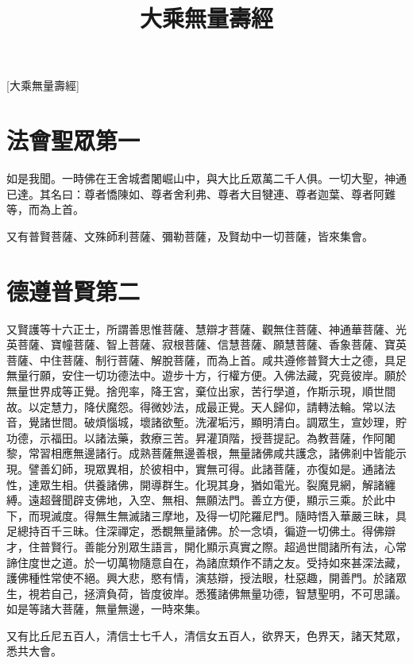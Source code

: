 \documentclass{zhvt-classic}
\title{大乘無量壽經}
\begin{document}
[大乘無量壽經]

\setcounter{page}{1}
\tableofcontents

\mainmatter

\chapter*{法會聖眾第一}

如是我聞。一時佛在王舍城耆闍崛山中，與大比丘眾萬二千人俱。一切大聖，神通已達。其名曰：尊者憍陳如、尊者舍利弗、尊者大目犍連、尊者迦葉、尊者阿難等，而為上首。

又有普賢菩薩、文殊師利菩薩、彌勒菩薩，及賢劫中一切菩薩，皆來集會。

\chapter*{德遵普賢第二}

又賢護等十六正士，所謂善思惟菩薩、慧辯才菩薩、觀無住菩薩、神通華菩薩、光英菩薩、寶幢菩薩、智上菩薩、寂根菩薩、信慧菩薩、願慧菩薩、香象菩薩、寶英菩薩、中住菩薩、制行菩薩、解脫菩薩，而為上首。咸共遵修普賢大士之德，具足無量行願，安住一切功德法中。遊步十方，行權方便。入佛法藏，究竟彼岸。願於無量世界成等正覺。捨兜率，降王宮，棄位出家，苦行學道，作斯示現，順世間故。以定慧力，降伏魔怨。得微妙法，成最正覺。天人歸仰，請轉法輪。常以法音，覺諸世間。破煩惱城，壞諸欲塹。洗濯垢污，顯明清白。調眾生，宣妙理，貯功德，示福田。以諸法藥，救療三苦。昇灌頂階，授菩提記。為教菩薩，作阿闍黎，常習相應無邊諸行。成熟菩薩無邊善根，無量諸佛咸共護念，諸佛剎中皆能示現。譬善幻師，現眾異相，於彼相中，實無可得。此諸菩薩，亦復如是。通諸法性，達眾生相。供養諸佛，開導群生。化現其身，猶如電光。裂魔見網，解諸纏縛。遠超聲聞辟支佛地，入空、無相、無願法門。善立方便，顯示三乘。於此中下，而現滅度。得無生無滅諸三摩地，及得一切陀羅尼門。隨時悟入華嚴三昧，具足總持百千三昧。住深禪定，悉覩無量諸佛。於一念頃，徧遊一切佛土。得佛辯才，住普賢行。善能分別眾生語言，開化顯示真實之際。超過世間諸所有法，心常諦住度世之道。於一切萬物隨意自在，為諸庶類作不請之友。受持如來甚深法藏，護佛種性常使不絕。興大悲，愍有情，演慈辯，授法眼，杜惡趣，開善門。於諸眾生，視若自己，拯濟負荷，皆度彼岸。悉獲諸佛無量功德，智慧聖明，不可思議。如是等諸大菩薩，無量無邊，一時來集。

又有比丘尼五百人，清信士七千人，清信女五百人，欲界天，色界天，諸天梵眾，悉共大會。
\end{document}
